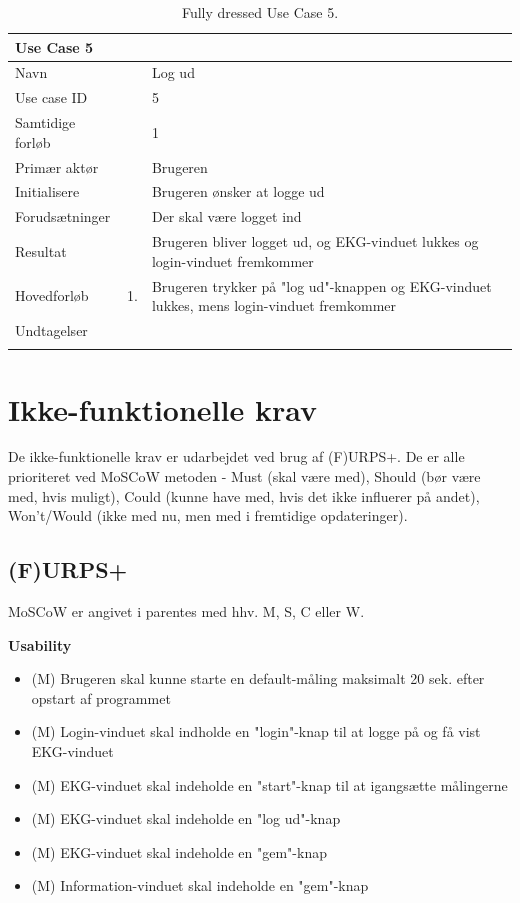 \begin{longtabu} to  %
    {\large \textbf{Use Case 5}} && \\
    \toprule
    Navn &&    Log ud\\
    Use case ID &&    5\\
    Samtidige forløb &&    1\\
    Primær aktør &&    Brugeren\\
    Initialisere &&    Brugeren ønsker at logge ud\\
    Forudsætninger &&  Der skal være logget ind\\
    Resultat &&    Brugeren bliver logget ud, og EKG-vinduet lukkes og login-vinduet fremkommer                     \\ \midrule
    Hovedforløb &    1. &    Brugeren trykker på "log ud"-knappen og EKG-vinduet lukkes, mens login-vinduet fremkommer 
    \\ \midrule
    Undtagelser & &
         \\ \bottomrule
\caption{Fully dressed Use Case 5.}
\label{UC5}
\end{longtabu}

\section{Ikke-funktionelle krav}
De ikke-funktionelle krav er udarbejdet ved brug af (F)URPS+. De er alle prioriteret ved MoSCoW metoden - Must (skal være med), Should (bør være med, hvis muligt), Could (kunne have med, hvis det ikke influerer på andet), Won't/Would (ikke med nu, men med i fremtidige opdateringer). 

\subsection{(F)URPS+}
MoSCoW er angivet i parentes med hhv. M, S, C eller W.

\textbf{Usability}
\begin{itemize}
	\item (M) Brugeren skal kunne starte en default-måling maksimalt 20 sek. efter opstart af programmet
	\item (M) Login-vinduet skal indholde en "login"-knap til at logge på og få vist EKG-vinduet
	\item (M) EKG-vinduet skal indeholde en "start"-knap til at igangsætte målingerne
	\item (M) EKG-vinduet skal indeholde en "log ud"-knap
	\item (M) EKG-vinduet  skal indeholde en "gem"-knap
	\item (M) Information-vinduet skal indeholde en "gem"-knap
\end{itemize}

